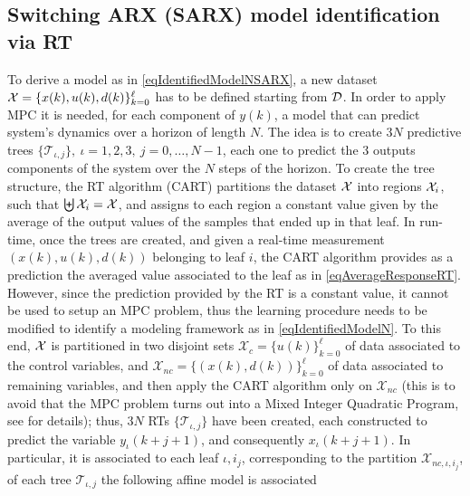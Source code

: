 \subsection{Switching ARX (SARX) model identification via RT} To derive a model as in \eqref{eqIdentifiedModelNSARX}, a new dataset $\mathcal{X}= \{x(k),u(k),d(k)\}_{k = 0}^{\ell}$ has to be defined starting from $\mathcal{D}$. In order to apply MPC it is needed, for each component of $y(k)$, a model that can predict system's dynamics over a horizon of length $N$. The idea is to create $3 N$ predictive trees $\{\mathcal{T}_{\iota,j}\},\ \iota=1,2,3,\ j=0,\ldots,N-1$, each one to predict the 3 outputs components of the system over the $N$ steps of the horizon. To create the tree structure, the RT algorithm (CART) partitions the dataset $\mathcal{X}$ into regions $\mathcal{X}_i$, such that $\biguplus \mathcal{X}_i = \mathcal{X}$, and assigns to each region a constant value given by the average of the output values of the samples that ended up in that leaf. In run-time, once the trees are created, and given a real-time measurement $(x(k), u(k), d(k))$ belonging to leaf $i$, the CART algorithm provides as a prediction the averaged value associated to the leaf as in \eqref{eqAverageResponseRT}. However, since the prediction provided by the RT is a constant value, it cannot be used to setup an MPC problem, thus the learning procedure needs to be modified to identify a modeling framework as in \eqref{eqIdentifiedModelN}. To this end, $\mathcal{X}$ is partitioned in two disjoint sets $\mathcal{X}_c = \{u(k)\}_{k=0}^{\ell}$ of data associated to the control variables, and $\mathcal{X}_{nc} = \{(x(k), d(k))\}_{k=0}^{\ell}$ of data associated to remaining variables, and then apply the CART algorithm only on $\mathcal{X}_{nc}$ (this is to avoid that the MPC problem turns out into a Mixed Integer Quadratic Program, see \cite{SmarraADHS2018,smarraNAHS2020} for details); thus, $3 N$ RTs $\{\mathcal{T}_{\iota,j}\}$ have been created, each constructed to predict the variable $y_\iota(k+j+1)$, and consequently $x_\iota(k+j+1)$. In particular, it is associated to each leaf $\iota,i_j$, corresponding to the partition  $\mathcal{X}_{nc,\iota,i_j}$, of each tree $\mathcal{T}_{\iota,j}$ the following affine model is associated

